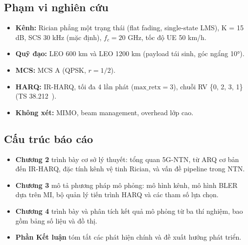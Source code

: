\subsection{Phạm vi nghiên cứu}

\begin{itemize}
    \item \textbf{Kênh:} Rician phẳng một trạng thái (flat fading, single-state LMS), K = 15 dB, SCS 30 kHz (mặc định), $f_c = 20$ GHz, tốc độ UE 50 km/h.
    \item \textbf{Quỹ đạo:} LEO 600 km và LEO 1200 km (payload tái sinh, góc ngẩng 10°).
    \item \textbf{MCS:} MCS A (QPSK, $r = 1/2$).
    \item \textbf{HARQ:} IR-HARQ, tối đa 4 lần phát ($\text{max\_retx} = 3$), chuỗi RV \{0, 2, 3, 1\} (TS 38.212~\cite{ts38212}).
    \item \textbf{Không xét:} MIMO, beam management, overhead lớp cao.
\end{itemize}

\subsection{Cấu trúc báo cáo}

\begin{itemize}
    \item \textbf{Chương 2} trình bày cơ sở lý thuyết: tổng quan 5G-NTN, từ ARQ cơ bản đến IR-HARQ, đặc tính kênh vệ tinh Rician, và vấn đề pipeline trong NTN.
    \item \textbf{Chương 3} mô tả phương pháp mô phỏng: mô hình kênh, mô hình BLER dựa trên MI, bộ quản lý tiến trình HARQ và các tham số lựa chọn.
    \item \textbf{Chương 4} trình bày và phân tích kết quả mô phỏng từ ba thí nghiệm, bao gồm bảng số liệu và đồ thị.
    \item \textbf{Phần Kết luận} tóm tắt các phát hiện chính và đề xuất hướng phát triển.
\end{itemize}
